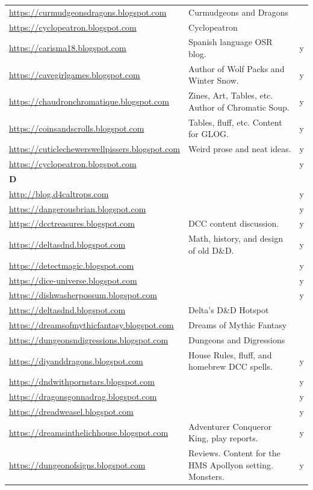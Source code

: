 \documentclass[a4paper, 11pt, twoside]{article}
\begin{document}
\begin{longtable}{p{6cm}p{8cm}c}
\url{https://curmudgeonsdragons.blogspot.com} & Curmudgeons and Dragons & \\
\url{https://cyclopeatron.blogspot.com} & Cyclopeatron & \\
\url{https://carisma18.blogspot.com} & Spanish language OSR blog. & y\\
\url{https://cavegirlgames.blogspot.com} & Author of Wolf Packs and Winter Snow. & y\\
\url{https://chaudronchromatique.blogspot.com} & Zines, Art, Tables, etc. Author of Chromatic Soup. & y\\
\url{https://coinsandscrolls.blogspot.com} & Tables, fluff, etc. Content for GLOG. & y\\
\url{https://cuticlechewerswellpissers.blogspot.com} & Weird prose and neat ideas. & y\\
\url{https://cyclopeatron.blogspot.com} &  & y\\
\textbf{D} &  & \\
\url{http://blog.d4caltrops.com} &  & y\\
\url{https://dangerousbrian.blogspot.com} &  & y\\
\url{https://dcctreasures.blogspot.com} & DCC content discussion. & y\\
\url{https://deltasdnd.blogspot.com} & Math, history, and design of old D\&D. & y\\
\url{https://detectmagic.blogspot.com} &  & y\\
\url{https://dice-universe.blogspot.com} &  & y\\
\url{https://dishwasherpossum.blogspot.com} &  & y\\
\url{https://deltasdnd.blogspot.com} & Delta's D\&D Hotspot & \\
\url{https://dreamsofmythicfantasy.blogspot.com} & Dreams of Mythic Fantasy & \\
\url{https://dungeonsndigressions.blogspot.com} & Dungeons and Digressions & \\
\url{https://diyanddragons.blogspot.com} & House Rules, fluff, and homebrew DCC spells. & y\\
\url{https://dndwithpornstars.blogspot.com} &  & y\\
\url{https://dragonsgonnadrag.blogspot.com} &  & y\\
\url{https://dreadweasel.blogspot.com} &  & y\\
\url{https://dreamsinthelichhouse.blogspot.com} & Adventurer Conqueror King, play reports. & y\\
\url{https://dungeonofsigns.blogspot.com} & Reviews. Content for the HMS Apollyon setting. Monsters. & y\\

\end{longtable}
\end{document}
